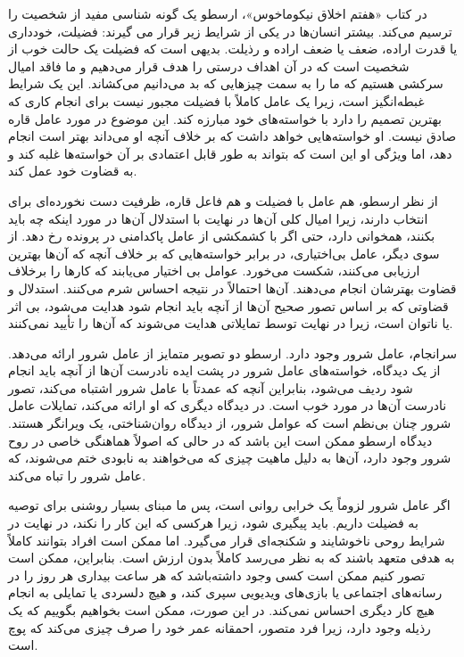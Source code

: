 در کتاب «هفتم اخلاق نیکوماخوس»، ارسطو یک گونه شناسی مفید از شخصیت را ترسیم می‌کند.
بیشتر انسان‌ها در یکی از شرایط زیر قرار می گیرند: فضیلت، خودداری یا قدرت اراده، ضعف یا ضعف اراده و رذیلت.
بدیهی است که فضیلت یک حالت خوب از شخصیت است که در آن اهداف درستی را هدف قرار می‌دهیم و ما فاقد امیال سرکشی هستیم که ما را به سمت چیزهایی که بد می‌دانیم می‌کشاند.
این یک شرایط غبطه‌انگیز است، زیرا یک عامل کاملاً با فضیلت مجبور نیست برای انجام کاری که بهترین تصمیم را دارد با خواسته‌های خود مبارزه کند.
این موضوع در مورد عامل قاره صادق نیست.
او خواسته‌هایی خواهد داشت که بر خلاف آنچه او می‌داند بهتر است انجام دهد، اما ویژگی او این است که بتواند به طور قابل اعتمادی بر آن خواسته‌ها غلبه کند و به قضاوت خود عمل کند.

از نظر ارسطو، هم عامل با فضیلت و هم فاعل قاره، ظرفیت دست نخورده‌ای برای انتخاب دارند، زیرا امیال کلی آن‌ها در نهایت با استدلال آن‌ها در مورد اینکه چه باید بکنند، همخوانی دارد، حتی اگر با کشمکشی از عامل پاکدامنی در پرونده رخ دهد.
 از سوی دیگر، عامل بی‌اختیاری، در برابر خواسته‌هایی که بر خلاف آنچه که آن‌ها بهترین ارزیابی می‌کنند، شکست می‌خورد.
 عوامل بی اختیار می‌یابند که کارها را برخلاف قضاوت بهترشان انجام می‌دهند.
 آن‌ها احتمالاً در نتیجه احساس شرم می‌کنند.
 استدلال و قضاوتی که بر اساس تصور صحیح آن‌ها از آنچه باید انجام شود هدایت می‌شود، بی اثر یا ناتوان است، زیرا در نهایت توسط تمایلاتی هدایت می‌شوند که آن‌ها را تأیید نمی‌کنند.

سرانجام، عامل شرور وجود دارد.
ارسطو دو تصویر متمایز از عامل شرور ارائه می‌دهد.
از یک دیدگاه، خواسته‌های عامل شرور در پشت ایده نادرست آن‌ها از آنچه باید انجام شود ردیف می‌شود، بنابراین آنچه که عمدتاً با عامل شرور اشتباه می‌کند، تصور نادرست آن‌ها در مورد خوب است.
در دیدگاه دیگری که او ارائه می‌کند، تمایلات عامل شرور چنان بی‌نظم است که عوامل شرور، از دیدگاه روان‌شناختی، یک ویرانگر هستند.
دیدگاه ارسطو ممکن است این باشد که در حالی که اصولاً هماهنگی خاصی در روح شرور وجود دارد، آن‌ها به دلیل ماهیت چیزی که می‌خواهند به نابودی ختم می‌شوند، که عامل شرور را تباه می‌کند.

اگر عامل شرور لزوماً یک خرابی روانی است، پس ما مبنای بسیار روشنی برای توصیه به فضیلت داریم.
باید پیگیری شود، زیرا هرکسی که این کار را نکند، در نهایت در شرایط روحی ناخوشایند و شکنجه‌ای قرار می‌گیرد.
اما ممکن است افراد بتوانند کاملاً به هدفی متعهد باشند که به نظر می‌رسد کاملاً بدون ارزش است.
بنابراین، ممکن است تصور کنیم ممکن است کسی وجود داشته‌باشد که هر ساعت بیداری هر روز را در رسانه‌های اجتماعی یا بازی‌های ویدیویی سپری کند، و هیچ دلسردی یا تمایلی به انجام هیچ کار دیگری احساس نمی‌کند.
در این صورت، ممکن است بخواهیم بگوییم که یک رذیله وجود دارد، زیرا فرد متصور، احمقانه عمر خود را صرف چیزی می‌کند که پوچ است.

